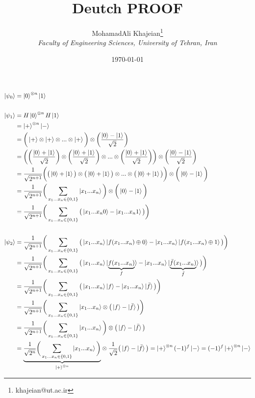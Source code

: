 \documentclass{article}
\title{\textbf{Deutch PROOF}}
\author{
    MohamadAli Khajeian\footnote{khajeian@ut.ac.ir} \\ 
    \small \textit{Faculty of Engineering Sciences, University of Tehran, Iran} \\ 
}
\date{\today}
\begin{document}
\maketitle
\begin{align*}
   \ket{\psi_{0}} &= \ket{0}^{\otimes n} \ket{1} \\ \\
   \ket{\psi_{1}} &= H\ket{0}^{\otimes n} H\ket{1} \\
   &= \ket{+}^{\otimes n} \ket{-} \\&= \bigg(\ket{+}\otimes\ket{+}\otimes...\otimes\ket{+}\bigg)\otimes\bigg(\frac{\ket{0}-\ket{1}}{\sqrt{2}}\bigg) \\
   &=  \bigg(\bigg(\frac{\ket{0}+\ket{1}}{\sqrt{2}}\bigg)\otimes\bigg(\frac{\ket{0}+\ket{1}}{\sqrt{2}}\bigg)\otimes...\otimes\bigg(\frac{\ket{0}+\ket{1}}{\sqrt{2}}\bigg)\bigg)\otimes\bigg(\frac{\ket{0}-\ket{1}}{\sqrt{2}}\bigg) \\
   &=  \frac{1}{\sqrt{2^{n+1}}}\bigg(\big(\ket{0}+\ket{1}\big)\otimes\big(\ket{0}+\ket{1}\big)\otimes...\otimes\big(\ket{0}+\ket{1}\big)\bigg)\otimes\bigg(\ket{0}-\ket{1}\bigg) \\
   &=  \frac{1}{\sqrt{2^{n+1}}}\bigg(\sum_{x_{1}...x_{n} \in \{0,1\}} \ket{x_{1}...x_{n}} \bigg)\otimes\bigg(\ket{0}-\ket{1}\bigg) \\
   &=  \frac{1}{\sqrt{2^{n+1}}}\bigg(\sum_{x_{1}...x_{n} \in \{0,1\}} \big( \ket{x_{1}...x_{n}0} - \ket{x_{1}...x_{n}1} \big) \bigg) \\ \\
   \ket{\psi_{2}} &= \frac{1}{\sqrt{2^{n+1}}}\bigg(\sum_{x_{1}...x_{n} \in \{0,1\}} \big( \ket{x_{1}...x_{n}}\ket{f(x_{1}...x_{n})\oplus0} - \ket{x_{1}...x_{n}}\ket{f(x_{1}...x_{n})\oplus1} \big) \bigg) \\
   &= \frac{1}{\sqrt{2^{n+1}}}\bigg(\sum_{x_{1}...x_{n} \in \{0,1\}} \big( \ket{x_{1}...x_{n}}\ket{\underset{f}{\underbrace{f(x_{1}...x_{n})}}} - \ket{x_{1}...x_{n}}\ket{\underset{\bar{f}}{\underbrace{\bar{f}(x_{1}...x_{n})}}} \big) \bigg) \\
   &= \frac{1}{\sqrt{2^{n+1}}}\bigg(\sum_{x_{1}...x_{n} \in \{0,1\}} \big( \ket{x_{1}...x_{n}}\ket{f} - \ket{x_{1}...x_{n}}\ket{\bar{f}} \big) \bigg) \\
   &= \frac{1}{\sqrt{2^{n+1}}}\bigg(\sum_{x_{1}...x_{n} \in \{0,1\}} \ket{x_{1}...x_{n}}\otimes\big(\ket{f}-\ket{\bar{f}}\big) \bigg) \\
   &= \frac{1}{\sqrt{2^{n+1}}}\bigg(\sum_{x_{1}...x_{n} \in \{0,1\}} \ket{x_{1}...x_{n}}\bigg) \otimes\big(\ket{f}-\ket{\bar{f}}\big) \\
   &= \underset{\ket{+}^{\otimes n}}{\underbrace{\frac{1}{\sqrt{2^{n}}}\bigg(\sum_{x_{1}...x_{n} \in \{0,1\}} \ket{x_{1}...x_{n}}\bigg)}} \otimes \frac{1}{\sqrt{2}} \big(\ket{f}-\ket{\bar{f}}\big) = \ket{+}^{\otimes n}(-1)^{f}\ket{-} = (-1)^{f}\ket{+}^{\otimes n}\ket{-}
\end{align*}
\end{document}
